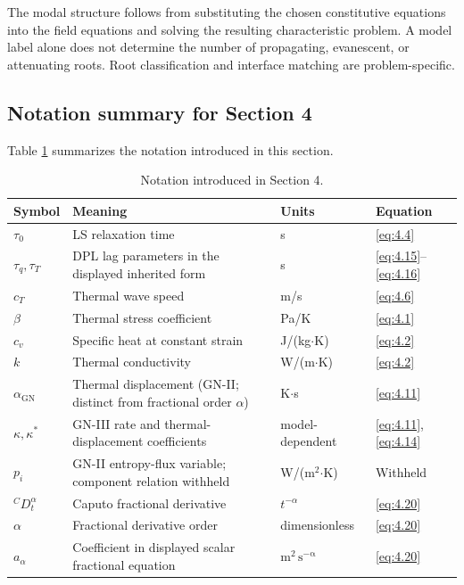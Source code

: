 The modal structure follows from substituting the chosen constitutive equations into the field equations and solving the resulting characteristic problem. A model label alone does not determine the number of propagating, evanescent, or attenuating roots. Root classification and interface matching are problem-specific.

\subsection{Notation summary for Section 4}

Table \ref{tab:notation-sec4} summarizes the notation introduced in this section.

\begin{table}[htbp]
\centering
\small
\caption{Notation introduced in Section 4.}
\label{tab:notation-sec4}
\begin{tabularx}{\textwidth}{@{}p{1.8cm}X p{2.2cm}p{2.1cm}@{}}
\toprule
\textbf{Symbol} & \textbf{Meaning} & \textbf{Units} & \textbf{Equation} \\
\midrule
$\tau_0$ & LS relaxation time & s & \eqref{eq:4.4} \\
$\tau_q, \tau_T$ & DPL lag parameters in the displayed inherited form & s & \eqref{eq:4.15}--\eqref{eq:4.16} \\
$c_T$ & Thermal wave speed & m/s & \eqref{eq:4.6} \\
$\beta$ & Thermal stress coefficient & Pa/K & \eqref{eq:4.1} \\
$c_v$ & Specific heat at constant strain & J/(kg$\cdot$K) & \eqref{eq:4.2} \\
$k$ & Thermal conductivity & W/(m$\cdot$K) & \eqref{eq:4.2} \\
$\alpha_{\mathrm{GN}}$ & Thermal displacement (GN-II; distinct from fractional order $\alpha$) & K$\cdot$s & \eqref{eq:4.11} \\
$\kappa,\kappa^*$ & GN-III rate and thermal-displacement coefficients & model-dependent & \eqref{eq:4.11}, \eqref{eq:4.14} \\
$p_i$ & GN-II entropy-flux variable; component relation withheld & W/(m$^2$$\cdot$K) & Withheld \\
${}^C D_t^\alpha$ & Caputo fractional derivative & $t^{-\alpha}$ & \eqref{eq:4.20} \\
$\alpha$ & Fractional derivative order & dimensionless & \eqref{eq:4.20} \\
$a_\alpha$ & Coefficient in displayed scalar fractional equation & $\mathrm{m^2\,s^{-\alpha}}$ & \eqref{eq:4.20} \\
\bottomrule
\end{tabularx}
\end{table}

